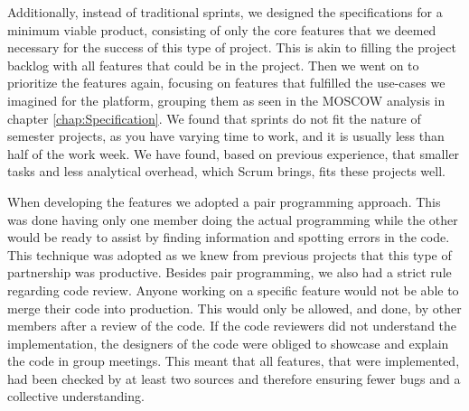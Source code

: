 Additionally, instead of traditional sprints, we designed the specifications for a minimum viable product, consisting of only the core features that we deemed necessary for the success of this type of project. 
This is akin to filling the project backlog with all features that could be in the project. Then we went on to prioritize the features again, focusing on features that fulfilled the use-cases we imagined for the platform, grouping them as seen in the MOSCOW analysis in chapter \ref{chap:Specification}.
We found that sprints do not fit the nature of semester projects, as you have varying time to work, and it is usually less than half of the work week. We have found, based on previous experience, that smaller tasks and less analytical overhead, which Scrum brings, fits these projects well\cite{sutherlandScrumArtDoing2014}.

When developing the features we adopted a pair programming approach. This was done having only one member doing the actual programming while the other would be ready to assist by finding information and spotting errors in the code. This technique was adopted as we knew from previous projects that this type of partnership was productive. Besides pair programming, we also had a strict rule regarding code review. Anyone working on a specific feature would not be able to merge their code into production. This would only be allowed, and done, by other members after a review of the code. If the code reviewers did not understand the implementation, the designers of the code were obliged to showcase and explain the code in group meetings. This meant that all features, that were implemented, had been checked by at least two sources and therefore ensuring fewer bugs and a collective understanding.


